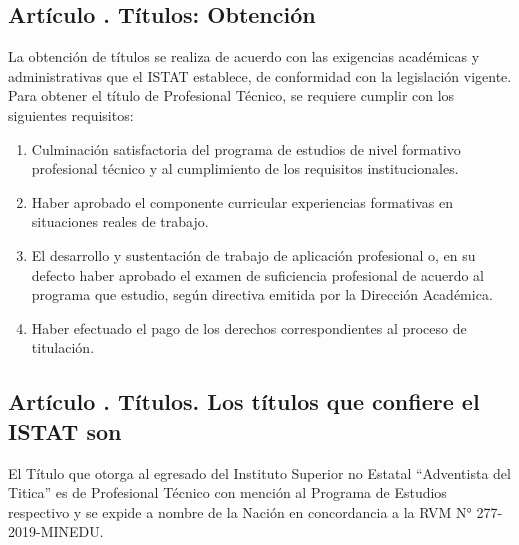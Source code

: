 \subsection{Artículo . Títulos: Obtención}
\addtocounter{ns}{1}
La obtención de títulos se realiza de acuerdo con las exigencias académicas y administrativas que el ISTAT establece, de conformidad con la legislación vigente. 
Para obtener el título de Profesional Técnico, se requiere cumplir con los siguientes requisitos: 
\begin{enumerate}
\item Culminación satisfactoria del programa de estudios de nivel formativo profesional técnico y al cumplimiento de los requisitos institucionales.
\item Haber aprobado el componente curricular experiencias formativas en situaciones reales de trabajo. 
\item El desarrollo y sustentación de trabajo de aplicación profesional o, en su defecto haber aprobado el examen de suficiencia profesional de acuerdo al programa que estudio, según directiva emitida por la Dirección Académica. 
\item Haber efectuado el pago de los derechos correspondientes al proceso de titulación. 
\end{enumerate}
\subsection{Artículo . Títulos. Los títulos que confiere el ISTAT son}
\addtocounter{ns}{1}
El Título que otorga al egresado del Instituto Superior no Estatal “Adventista del Titica” es de Profesional Técnico con mención al Programa de Estudios respectivo y se expide a nombre de la Nación en concordancia a la RVM N° 277-2019-MINEDU.
